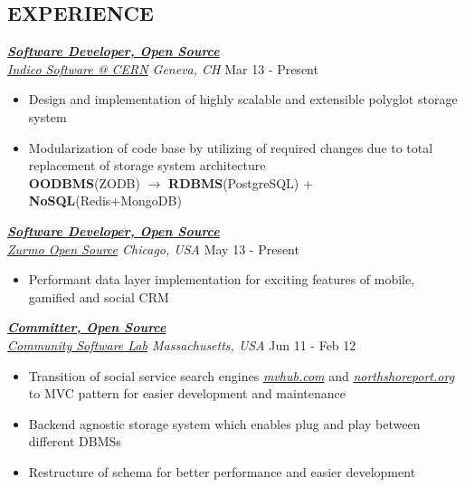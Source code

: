 \documentclass[line, margin]{res}
\begin{document}
\begin{resume}
\section{EXPERIENCE}

  {\sl \textbf{\href{http://indico-software.org/}{Software Developer, Open Source}} \\ \href{http://indico.cern.ch/}{Indico Software @ CERN} Geneva, CH} \hfill Mar 13 - Present \\
  \vspace{-0.3cm}
  \begin{itemize}
    \item Design and implementation of highly scalable and extensible polyglot storage system
    \item Modularization of code base by utilizing of required changes due to total replacement of storage system architecture \\ \textbf{OODBMS}(ZODB) $\rightarrow$ \textbf{RDBMS}(PostgreSQL) + \textbf{NoSQL}(Redis+MongoDB)
  \end{itemize}

  {\sl \textbf{\href{https://bitbucket.org/zurmo/}{Software Developer, Open Source}} \\ \href{http://zurmo.org}{Zurmo Open Source} Chicago, USA} \hfill May 13 - Present \\
  \vspace{-0.3cm}
  \begin{itemize}
    \item Performant data layer implementation for exciting features of mobile, gamified and social CRM
  \end{itemize}

	{\sl \textbf{\href{https://launchpad.net/mvhub}{Committer, Open Source}} \\ \href{http://thecsl.org/}{Community Software Lab} Massachusetts, USA} \hfill Jun 11 - Feb 12 \\
	\vspace{-0.3cm}
	\begin{itemize} \itemsep -2pt
		\item Transition of social service search engines \textit{\href{http://mvhub.com/}{mvhub.com}} and \textit{\href{http://northshoreport.org/}{northshoreport.org}} to MVC pattern for easier development and maintenance
		\item Backend agnostic storage system which enables plug and play between different DBMSs
		\item Restructure of schema for better performance and easier development
	\end{itemize}


\end{resume}
\end{document}
